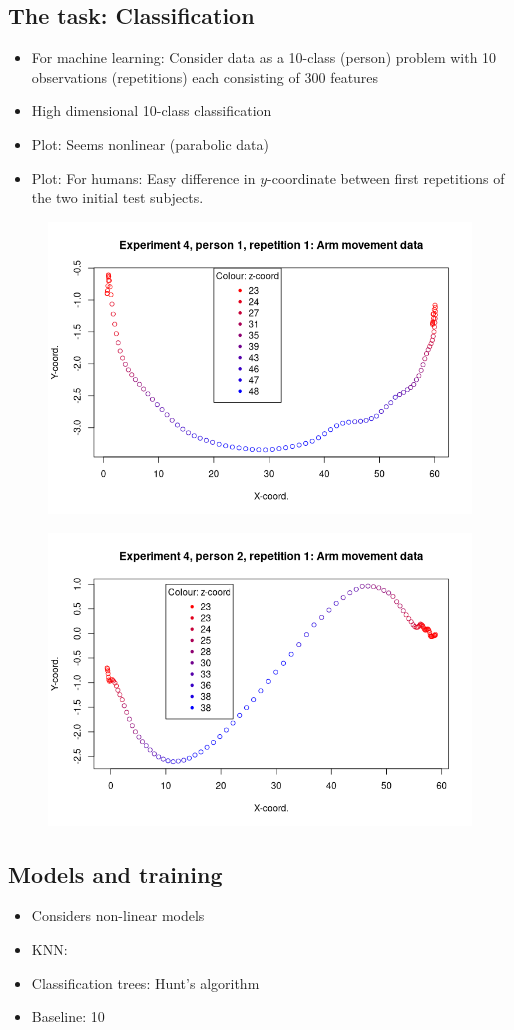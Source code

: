 \documentclass[12pt,fleqn]{article}
\begin{document}
\subsection{The task: Classification}
\begin{itemize}
\item For machine learning: Consider data as a 10-class (person) problem with 10 observations (repetitions) each consisting of 300 features 
\item High dimensional 10-class classification 
\item Plot: Seems nonlinear (parabolic data)
\item Plot: For humans: Easy difference in \(y\)-coordinate between first repetitions of the two initial test subjects.
\end{itemize}
\begin{figure}[H]
	\centering
	\includegraphics[width=.7\linewidth]{p1_example}
\end{figure}
\begin{figure}[H]
	\centering
	\includegraphics[width=.7\linewidth]{p1_example2}
\end{figure}
\subsection{Models and training}
\begin{itemize}
	\item Considers non-linear models
	\item KNN:
	\item Classification trees: Hunt's algorithm
	\item Baseline: 10\pro
\end{itemize}
\end{document}
